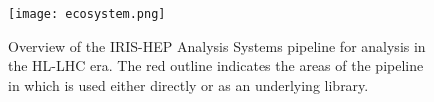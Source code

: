 \begin{figure}
    \centering
    \texttt{[image: ecosystem.png]}
    \caption{Overview of the IRIS-HEP Analysis Systems pipeline for analysis in the HL-LHC era.
The red outline indicates the areas of the pipeline in which \pyhf{} is used either directly or as an underlying library.}
    \label{fig:analysis-systems-pipeline}
\end{figure}

